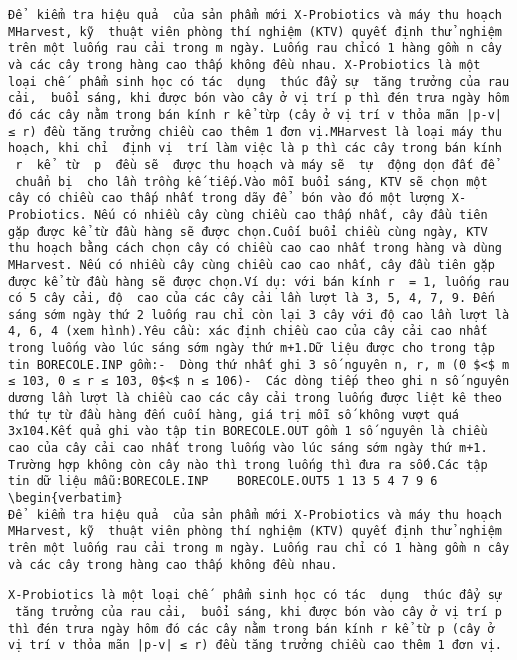 
\begin{verbatim}
Để  kiểm tra hiệu quả  của sản phẩm mới X-Probiotics và máy thu hoạch MHarvest, kỹ  thuật viên phòng thí nghiệm (KTV) quyết định thử nghiệm trên một luống rau cải trong m ngày. Luống rau chỉcó 1 hàng gồm n cây và các cây trong hàng cao thấp không đều nhau. X-Probiotics là một loại chế  phẩm sinh học có tác  dụng  thúc đẩy sự  tăng trưởng của rau cải,  buổi sáng, khi được bón vào cây ở vị trí p thì đén trưa ngày hôm đó các cây nằm trong bán kính r kể từp (cây ở vị trí v thỏa mãn |p-v| ≤ r) đều tăng trưởng chiều cao thêm 1 đơn vị.MHarvest là loại máy thu hoạch, khi chỉ  định vị  trí làm việc là p thì các cây trong bán kính  r  kể  từ  p  đều sẽ  được thu hoạch và máy sẽ  tự  động dọn đất để  chuẩn bị  cho lần trồng kế tiếp.Vào mỗi buổi sáng, KTV sẽ chọn một cây có chiều cao thấp nhất trong dãy để  bón vào đó một lượng X-Probiotics. Nếu có nhiều cây cùng chiều cao thấp nhất, cây đầu tiên gặp được kể từ đầu hàng sẽ được chọn.Cuối buổi chiều cùng ngày, KTV thu hoạch bằng cách chọn cây có chiều cao cao nhất trong hàng và dùng MHarvest. Nếu có nhiều cây cùng chiều cao cao nhất, cây đầu tiên gặp được kể từ đầu hàng sẽ được chọn.Ví dụ: với bán kính r  = 1, luống rau có 5 cây cải, độ  cao của các cây cải lần lượt là 3, 5, 4, 7, 9. Đến sáng sớm ngày thứ 2 luống rau chỉ còn lại 3 cây với độ cao lần lượt là 4, 6, 4 (xem hình).Yêu cầu: xác định chiều cao của cây cải cao nhất trong luống vào lúc sáng sớm ngày thứ m+1.Dữ liệu được cho trong tập tin BORECOLE.INP gồm:-  Dòng thứ nhất ghi 3 số nguyên n, r, m (0 $<$ m ≤ 103, 0 ≤ r ≤ 103, 0$<$ n ≤ 106)-  Các dòng tiếp theo ghi n số nguyên dương lần lượt là chiều cao các cây cải trong luống được liệt kê theo thứ tự từ đầu hàng đến cuối hàng, giá trị mỗi số không vượt quá 3x104.Kết quả ghi vào tập tin BORECOLE.OUT gồm 1 số nguyên là chiều cao của cây cải cao nhất trong luống vào lúc sáng sớm ngày thứ m+1. Trường hợp không còn cây nào thì trong luống thì đưa ra số0.Các tập tin dữ liệu mẫu:BORECOLE.INP    BORECOLE.OUT5 1 13 5 4 7 9 6
\begin{verbatim}
Để  kiểm tra hiệu quả  của sản phẩm mới X-Probiotics và máy thu hoạch MHarvest, kỹ  thuật viên phòng thí nghiệm (KTV) quyết định thử nghiệm trên một luống rau cải trong m ngày. Luống rau chỉ có 1 hàng gồm n cây và các cây trong hàng cao thấp không đều nhau. \end{verbatim}
\begin{verbatim}
X-Probiotics là một loại chế  phẩm sinh học có tác  dụng  thúc đẩy sự  tăng trưởng của rau cải,  buổi sáng, khi được bón vào cây ở vị trí p thì đén trưa ngày hôm đó các cây nằm trong bán kính r kể từ p (cây ở vị trí v thỏa mãn |p-v| ≤ r) đều tăng trưởng chiều cao thêm 1 đơn vị.\end{verbatim}
